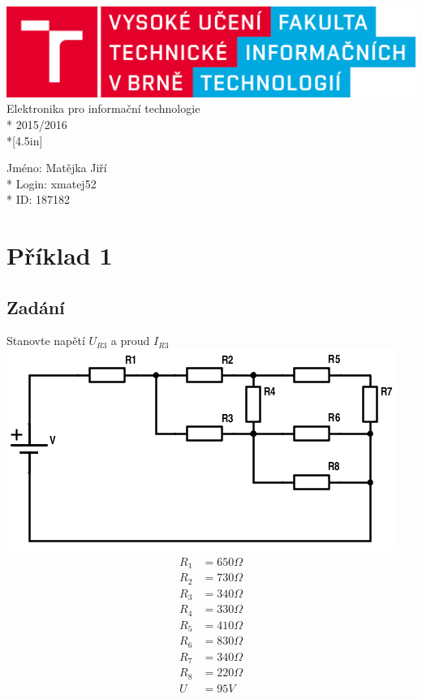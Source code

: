 \documentclass[a4paper, 10pt, fleqn]{article}
\begin{document}
\begin{center}
\includegraphics[scale=0.15]{IEL_OBR/fit.png}
\\[2.5in]
\LARGE
Elektronika pro informační technologie\\*
2015/2016	
\\*[4.5in]
\end{center}
\LARGE
Jméno: Matějka Jiří \\*
Login: xmatej52 \\*
ID: 187182

\newpage
\section*{Příklad 1}
\subsection*{Zadání}

Stanovte napětí $U_{R3}$ a proud $I_{R3}$\\
\includegraphics[scale=0.8]{IEL_OBR/1a.png}  \\
\begin{align*}
 R_{1} &= 650 \Omega \\
 R_{2} &= 730 \Omega \\
 R_{3} &= 340 \Omega \\
 R_{4} &= 330 \Omega \\
 R_{5} &= 410 \Omega \\
 R_{6} &= 830 \Omega \\
 R_{7} &= 340 \Omega \\
 R_{8} &= 220 \Omega \\
 U &= 95 V \\
\end{align*}
\end{document}
